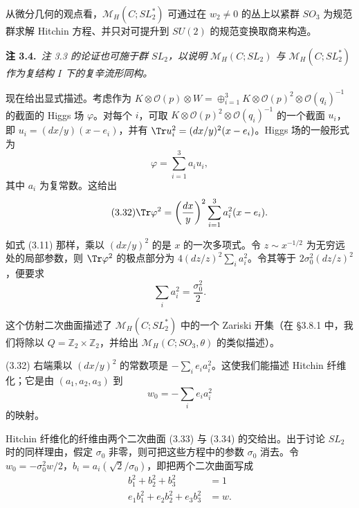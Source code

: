 从微分几何的观点看，$\mathcal{M}_H(C;SL_2^*)$ 可通过在 $w_2\ne0$ 的丛上以紧群 $SO_3$ 为规范群求解 Hitchin 方程、并只对可提升到 $SU(2)$ 的规范变换取商来构造。

\par\medskip
\noindent\textbf{注 3.4.}\ \textit{注 3.3 的论证也可施于群 $SL_2$，以说明 $\mathcal{M}_H(C;SL_2)$ 与 $\mathcal{M}_H(C;SL_2^*)$ 作为复结构 $I$ 下的复辛流形同构。}
\par\medskip

现在给出显式描述。考虑作为 $K\otimes\mathcal{O}(p)\otimes W=\oplus_{i=1}^3K\otimes\mathcal{O}(p)^2\otimes\mathcal{O}(q_i)^{-1}$ 的截面的 Higgs 场 $\varphi$。对每个 $i$，可取 $K\otimes\mathcal{O}(p)^2\otimes\mathcal{O}(q_i)^{-1}$ 的一个截面 $u_i$，即 $u_i=(dx/y)(x-e_i)$，并有 $\Tr u_i^2=(dx/y)^2(x-e_i)$。Higgs 场的一般形式为
\begin{equation}\tag{3.31}
\varphi=\sum_{i=1}^{3}a_iu_i,
\end{equation}
其中 $a_i$ 为复常数。这给出
\begin{equation}\tag{3.32}
\Tr\varphi^2=\left(\frac{dx}{y}\right)^2\sum_{i=1}^{3}a_i^2(x-e_i).
\end{equation}

如式 (3.11) 那样，乘以 $(dx/y)^2$ 的是 $x$ 的一次多项式。令 $z\sim x^{-1/2}$ 为无穷远处的局部参数，则 $\Tr\varphi^2$ 的极点部分为 $4(dz/z)^2\sum_i a_i^2$。令其等于 $2\sigma_0^2(dz/z)^2$，便要求
\begin{equation}\tag{3.33}
\sum_i a_i^2=\frac{\sigma_0^2}{2}.
\end{equation}

这个仿射二次曲面描述了 $\mathcal{M}_H(C;SL_2^*)$ 中的一个 Zariski 开集（在 §3.8.1 中，我们将除以 $Q=\mathbb{Z}_2\times\mathbb{Z}_2$，并给出 $\mathcal{M}_H(C;SO_3,\theta)$ 的类似描述）。

(3.32) 右端乘以 $(dx/y)^2$ 的常数项是 $-\sum_ie_ia_i^2$。这使我们能描述 Hitchin 纤维化；它是由 $(a_1,a_2,a_3)$ 到
\begin{equation}\tag{3.34}
w_0=-\sum_i e_ia_i^2
\end{equation}
的映射。

Hitchin 纤维化的纤维由两个二次曲面 (3.33) 与 (3.34) 的交给出。出于讨论 $SL_2$ 时的同样理由，假定 $\sigma_0$ 非零，则可把这些方程中的参数 $\sigma_0$ 消去。令 $w_0=-\sigma_0^2w/2$，$b_i=a_i(\sqrt2/\sigma_0)$，即把两个二次曲面写成
\begin{equation}\tag{3.35}
\begin{aligned}
b_1^2+b_2^2+b_3^2&=1\\
e_1b_1^2+e_2b_2^2+e_3b_3^2&=w.
\end{aligned}
\end{equation}

